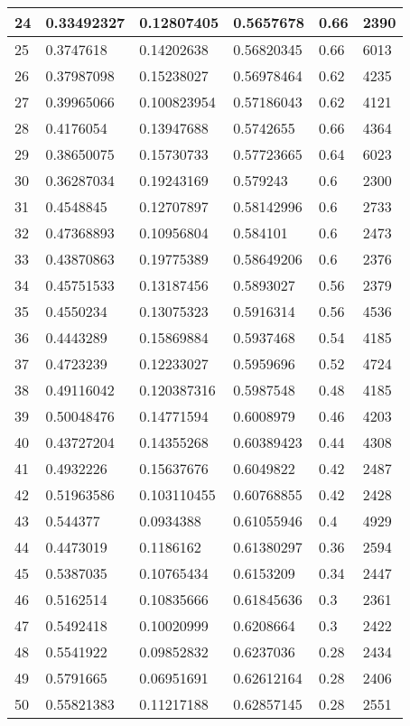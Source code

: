 \begin{longtable}{|l|l|l|l|l|l|}
24 & 0.33492327 & 0.12807405 & 0.5657678 & 0.66 & 2390 \\ \hline 
25 & 0.3747618 & 0.14202638 & 0.56820345 & 0.66 & 6013 \\ \hline 
26 & 0.37987098 & 0.15238027 & 0.56978464 & 0.62 & 4235 \\ \hline 
27 & 0.39965066 & 0.100823954 & 0.57186043 & 0.62 & 4121 \\ \hline 
28 & 0.4176054 & 0.13947688 & 0.5742655 & 0.66 & 4364 \\ \hline 
29 & 0.38650075 & 0.15730733 & 0.57723665 & 0.64 & 6023 \\ \hline 
30 & 0.36287034 & 0.19243169 & 0.579243 & 0.6 & 2300 \\ \hline 
31 & 0.4548845 & 0.12707897 & 0.58142996 & 0.6 & 2733 \\ \hline 
32 & 0.47368893 & 0.10956804 & 0.584101 & 0.6 & 2473 \\ \hline 
33 & 0.43870863 & 0.19775389 & 0.58649206 & 0.6 & 2376 \\ \hline 
34 & 0.45751533 & 0.13187456 & 0.5893027 & 0.56 & 2379 \\ \hline 
35 & 0.4550234 & 0.13075323 & 0.5916314 & 0.56 & 4536 \\ \hline 
36 & 0.4443289 & 0.15869884 & 0.5937468 & 0.54 & 4185 \\ \hline 
37 & 0.4723239 & 0.12233027 & 0.5959696 & 0.52 & 4724 \\ \hline 
38 & 0.49116042 & 0.120387316 & 0.5987548 & 0.48 & 4185 \\ \hline 
39 & 0.50048476 & 0.14771594 & 0.6008979 & 0.46 & 4203 \\ \hline 
40 & 0.43727204 & 0.14355268 & 0.60389423 & 0.44 & 4308 \\ \hline 
41 & 0.4932226 & 0.15637676 & 0.6049822 & 0.42 & 2487 \\ \hline 
42 & 0.51963586 & 0.103110455 & 0.60768855 & 0.42 & 2428 \\ \hline 
43 & 0.544377 & 0.0934388 & 0.61055946 & 0.4 & 4929 \\ \hline 
44 & 0.4473019 & 0.1186162 & 0.61380297 & 0.36 & 2594 \\ \hline 
45 & 0.5387035 & 0.10765434 & 0.6153209 & 0.34 & 2447 \\ \hline 
46 & 0.5162514 & 0.10835666 & 0.61845636 & 0.3 & 2361 \\ \hline 
47 & 0.5492418 & 0.10020999 & 0.6208664 & 0.3 & 2422 \\ \hline 
48 & 0.5541922 & 0.09852832 & 0.6237036 & 0.28 & 2434 \\ \hline 
49 & 0.5791665 & 0.06951691 & 0.62612164 & 0.28 & 2406 \\ \hline 
50 & 0.55821383 & 0.11217188 & 0.62857145 & 0.28 & 2551 \\ \hline 
\end{longtable}